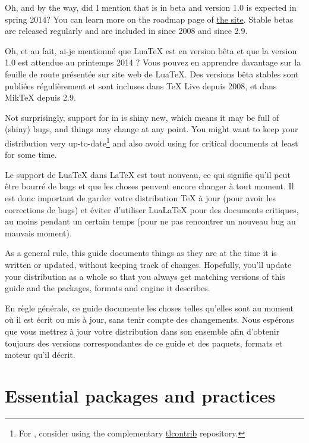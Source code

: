 \documentclass{lltxdoc}
\begin{document}
\medskip

Oh, and by the way, did I mention that \luatex is in beta and version 1.0 is
expected in spring 2014? You can learn more on the roadmap page of
\href{http://luatex.org/}{the \luatex site}. Stable betas are released
regularly and are included in \texlive since 2008 and \miktex since 2.9.

Oh, et au fait, ai-je mentionné que LuaTeX est en version bêta et que la version 1.0 est attendue au printemps 2014 ? Vous pouvez en apprendre davantage sur la feuille de route présentée sur site web de LuaTeX. Des versions bêta stables sont publiées régulièrement et sont incluses dans TeX Live depuis 2008, et dans MikTeX depuis 2.9.

Not surprisingly, support for \luatex in \latex is shiny new, which means it
may be full of (shiny) bugs, and things may change at any point. You might
want to keep your \tex distribution very up-to-date\footnote{For \texlive,
  consider using the complementary
  \href{http://tlcontrib.metatex.org/} {tlcontrib} repository.} and also avoid
using \lualatex for critical documents at least for some time.

Le support de LuaTeX dans LaTeX est tout nouveau, ce qui signifie qu'il peut être bourré de bugs et que les choses peuvent encore changer à tout moment. Il est donc important de garder votre distribution TeX à jour (pour avoir les corrections de bugs) et éviter d'utiliser LuaLaTeX pour des documents critiques, au moins pendant un certain temps (pour ne pas rencontrer un nouveau bug au mauvais moment).

As a general rule, this guide documents things as they are at the time it is
written or updated, without keeping track of changes. Hopefully, you'll update
your distribution as a whole so that you always get matching versions of this
guide and the packages, formats and engine it describes.

En règle générale, ce guide documente les choses telles qu'elles sont au moment où il est écrit ou mis à jour, sans tenir compte des changements. Nous espérons que vous mettrez à jour votre distribution dans son ensemble afin d'obtenir toujours des versions correspondantes de ce guide et des paquets, formats et moteur qu'il décrit.


\section{Essential packages and practices}\label{essential}
\end{document}
